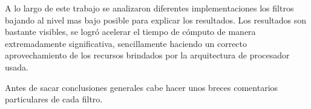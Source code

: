 \begin{comment}
	- ¿Valió la pena?
		- Evaluar costo de implementación vs performance.
		- Evaluar si el aumento de performance tiene o no sentido. (Caso decode, es bien al pedo. Sin embargo en aplicaciones de tiempo real o de uso masivo tiene mucho sentido porque el aumento es muy significativo).
		- 
	- ¿Cuánto pesa el uso óptimo del hardware vs el algorítmo?
		- Explicar por qué el algoritmo de fondo es el mismo concluyendo que un mejor uso del hardware puede lograr incrementos sumamente significativos.
	- ¿Se llegó a cambiar el orden de magnitud?
		- Si bien obviamente no se llegó orden de complejidad si aumenta el orden de magnitud en cuanto a velocidad de ejecución. Decode y miniature.

\end{comment}

	A lo largo de este trabajo se analizaron diferentes implementaciones
los filtros bajando al nivel mas bajo posible para explicar los resultados.
Los resultados son bastante visibles, se logró acelerar el tiempo de cómputo
de manera extremadamente significativa, sencillamente haciendo un correcto
aprovechamiento de los recursos brindados por la arquitectura de procesador
usada.

	Antes de sacar conclusiones generales cabe hacer unos breces comentarios
particulares de cada filtro.

